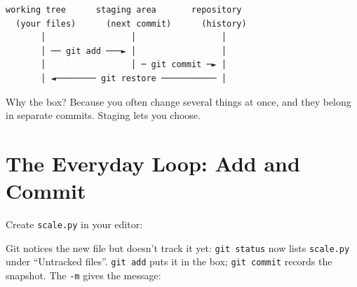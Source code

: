 \begin{codeblock}
\begin{Verbatim}[breaklines=false, fontsize=\fontsize{8.8}{8.68}\selectfont, fontfamily=diagrammono, formatcom=\diagramlines]
  working tree      staging area       repository
  (your files)      (next commit)      (history)
       │                 │                 │
       │ ── git add ───► │                 │
       │                 │ ─ git commit ─► │
       │ ◄──────── git restore ─────────── │
\end{Verbatim}
\end{codeblock}

Why the box? Because you often change several things at once, and they belong in separate commits. Staging lets you choose.


\section{The Everyday Loop: Add and Commit}\label{08-git-every-day:the-everyday-loop-add-and-commit}

Create \texttt{scale.py} in your editor:

\begin{codeblock}

\begin{Shaded}
\begin{Highlighting}[]
    \OperatorTok{*}

\NormalTok{, }\NormalTok{))}
\end{Highlighting}
\end{Shaded}

\end{codeblock}


Git notices the new file but doesn't track it yet: \texttt{git\ status} now lists \texttt{scale.py} under ``Untracked files''. \texttt{git\ add} puts it in the box; \texttt{git\ commit} records the snapshot. The \texttt{-m} gives the message:

\begin{codeblock}

\begin{Shaded}
\begin{Highlighting}[]
 
\end{Highlighting}
\end{Shaded}

\end{codeblock}

